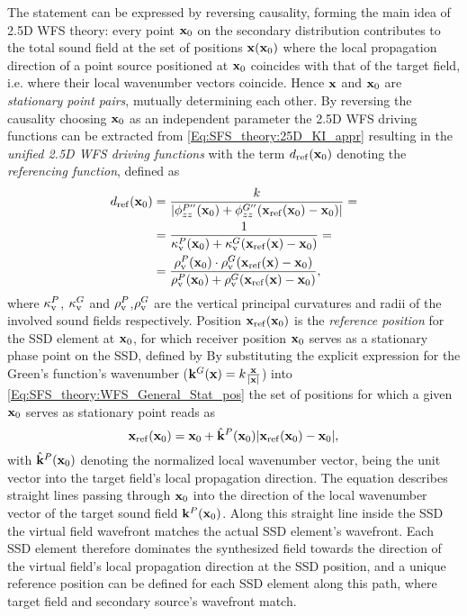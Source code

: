 The statement can be expressed by reversing causality, forming the main idea of 2.5D WFS theory: 
every point $\mathbf{x}_0$ on the secondary distribution contributes to the total sound field at the set of positions $\mathbf{x}(\mathbf{x}_0)$ where the local propagation direction of a point source positioned at $\mathbf{x}_0$ coincides with that of the target field, i.e. where their local wavenumber vectors coincide.
Hence $\mathbf{x}$ and $\mathbf{x}_0$ are \emph{stationary point pairs}, mutually determining each other.
By reversing the causality choosing $\mathbf{x}_0$ as an independent parameter the 2.5D WFS driving functions can be extracted from \eqref{Eq:SFS_theory:25D_KI_appr} resulting in the \emph{unified 2.5D WFS driving functions}
with the term $d_{\mathrm{ref}}(\mathbf{x}_0)$ denoting the \emph{referencing function}, defined as
\begin{align}
\label{Eq:SFS_theory:Referencing function}
d_{\mathrm{ref}}(\mathbf{x}_0) &= \frac{k}{|\phi^{P''}_{zz}(\mathbf{x}_0) +\phi^{G''}_{zz}(\mathbf{x}_{\mathrm{ref}}(\mathbf{x}_0)-\mathbf{x}_0)|} =\\
		 	&= \frac{1}{\kappa_\mathrm{v}^P(\mathbf{x}_0)+ \kappa_\mathrm{v}^G(\mathbf{x}_{\mathrm{ref}}(\mathbf{x})-\mathbf{x}_0)}  = \\
			&= \frac{\rho_\mathrm{v}^P(\mathbf{x}_0) \cdot \rho_\mathrm{v}^G(\mathbf{x}_{\mathrm{ref}}(\mathbf{x})-\mathbf{x}_0)}{\rho_\mathrm{v}^P(\mathbf{x}_0)+ \rho_\mathrm{v}^G(\mathbf{x}_{\mathrm{ref}}(\mathbf{x})-\mathbf{x}_0)} 
,
\end{align}
where $\kappa_\mathrm{v}^P$, $\kappa_\mathrm{v}^G$ and $\rho_\mathrm{v}^P$,$\rho_\mathrm{v}^G$ are the vertical principal curvatures and radii of the involved sound fields respectively.
Position $\mathbf{x}_{\mathrm{ref}}(\mathbf{x}_0)$ is the \emph{reference position} for the SSD element at $\mathbf{x}_0$, for which receiver position $\mathbf{x}_0$ serves as a stationary phase point on the SSD, defined by
By substituting the explicit expression for the Green's function's wavenumber ($\mathbf{k}^G(\mathbf{x}) = k\frac{\mathbf{x}}{|\mathbf{x}|}$) into \eqref{Eq:SFS_theory:WFS_General_Stat_pos} the set of positions for which a given $\mathbf{x}_0$ serves as stationary point reads as 
\begin{equation}
\mathbf{x}_{\mathrm{ref}}(\mathbf{x}_0) = \mathbf{x}_0 + \hat{\mathbf{k}}^P(\mathbf{x}_0) |\mathbf{x}_{\mathrm{ref}}(\mathbf{x}_0)-\mathbf{x}_0|,
\end{equation} 
with $\hat{\mathbf{k}}^P(\mathbf{x}_0)$ denoting the normalized local wavenumber vector, being the unit vector into the target field's local propagation direction.
The equation describes straight lines passing through $\mathbf{x}_0$ into the direction of the local wavenumber vector of the target sound field $\mathbf{k}^P(\mathbf{x}_0)$.
Along this straight line inside the SSD the virtual field wavefront matches the actual SSD element's wavefront.
Each SSD element therefore dominates the synthesized field towards the direction of the virtual field's local propagation direction at the SSD position, and a unique reference position can be defined for each SSD element along this path, where target field and secondary source's wavefront match.


